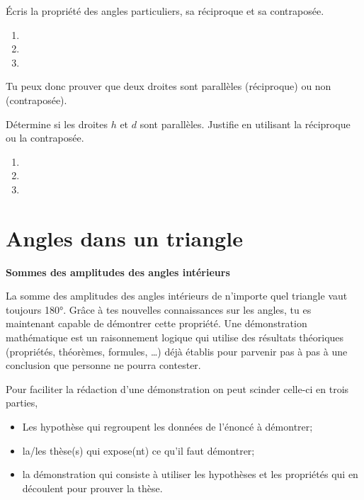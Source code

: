 \documentclass[../../syllabus_2.tex]{subfiles}
\begin{document}
\begin{exercise}
    Écris la propriété des angles particuliers, sa réciproque et sa contraposée.
    \begin{enumerate}[label=]
        \item{}
        \item{}
        \item{}
    \end{enumerate}
\end{exercise}

 Tu peux donc prouver que deux droites sont parallèles (réciproque) ou non (contraposée).

\begin{exercise}
    Détermine si les droites $h$ et $d$ sont parallèles. Justifie en utilisant la réciproque ou la contraposée.
    \begin{enumerate}[itemsep=3cm]
        \item 
        \item 
        \item 
    \end{enumerate}
\end{exercise}

\newpage
\section{Angles dans un triangle}

\textbf{Sommes des amplitudes des angles intérieurs}

La somme des amplitudes des angles intérieurs de n'importe quel triangle vaut toujours \ang{180}.
Grâce à tes nouvelles connaissances sur les angles, tu es maintenant capable de démontrer cette propriété.
Une démonstration mathématique est un raisonnement logique qui utilise des résultats théoriques (propriétés, théorèmes, formules, \dots) déjà établis pour parvenir pas à pas à une conclusion que personne ne pourra contester.

Pour faciliter la rédaction d'une démonstration on peut scinder celle-ci en trois parties,
\begin{itemize}
    \item Les hypothèse qui regroupent les données de l'énoncé à démontrer;
    \item la/les thèse(s) qui expose(nt) ce qu'il faut démontrer;
    \item la démonstration qui consiste à utiliser les hypothèses et les propriétés qui en découlent pour prouver la thèse.
\end{itemize}
\end{document}
